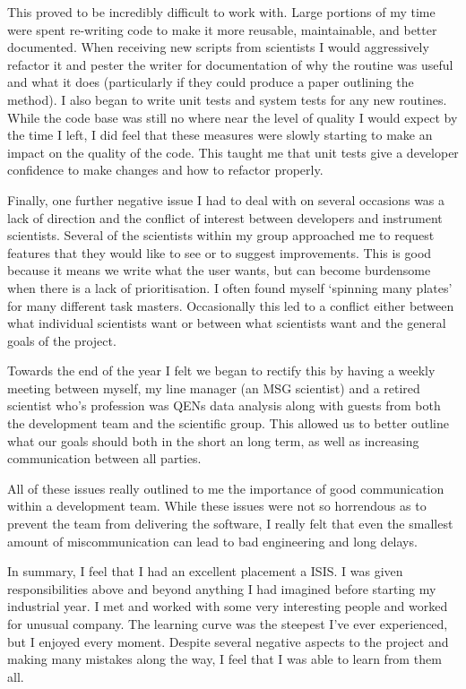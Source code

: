 \documentclass[paper=a4, fontsize=11pt]{scrartcl}	%
\numberwithin{equation}{section}															%
\numberwithin{figure}{section}																%
\numberwithin{table}{section}
\begin{document}
This proved to be incredibly difficult to work with. Large portions of
my time were spent re-writing code to make it more reusable,
maintainable, and better documented. When receiving new scripts from
scientists I would aggressively refactor it and pester the writer for
documentation of why the routine was useful and what it does
(particularly if they could produce a paper outlining the method). I
also began to write unit tests and system tests for any new routines.
While the code base was still no where near the level of quality I would
expect by the time I left, I did feel that these measures were slowly
starting to make an impact on the quality of the code. This taught me that unit tests give a developer confidence to make changes and how to refactor properly.

Finally, one further negative issue I had to deal with on several
occasions was a lack of direction and the conflict of interest between
developers and instrument scientists. Several of the scientists within
my group approached me to request features that they would like to see
or to suggest improvements. This is good because it means we write what
the user wants, but can become burdensome when there is a lack of
prioritisation. I often found myself `spinning many plates' for many
different task masters. Occasionally this led to a conflict either
between what individual scientists want or between what scientists want
and the general goals of the project.

Towards the end of the year I felt we began to rectify this by having a
weekly meeting between myself, my line manager (an MSG scientist) and a
retired scientist who's profession was QENs data analysis along with
guests from both the development team and the scientific group. This
allowed us to better outline what our goals should both in the short an
long term, as well as increasing communication between all parties.

All of these issues really outlined to me the importance of good communication within a development team. While these issues were not so horrendous as to prevent the team from delivering the software, I really felt that even the smallest amount of miscommunication can lead to bad engineering and long delays.

In summary, I feel that I had an excellent placement a ISIS. I was given
responsibilities above and beyond anything I had imagined before
starting my industrial year. I met and worked with some very interesting
people and worked for unusual company. The learning curve was the
steepest I've ever experienced, but I enjoyed every moment. Despite
several negative aspects to the project and making many mistakes along
the way, I feel that I was able to learn from them all.
\end{document}
